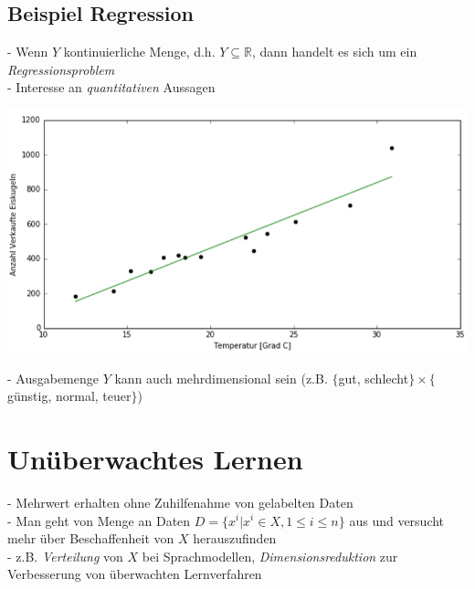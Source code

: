 \documentclass{report}
\begin{document}
\subsection{Beispiel Regression}
- Wenn $Y$ kontinuierliche Menge, d.h. $Y \subseteq \mathbb{R}$, dann handelt es sich um ein \textit{Regressionsproblem}\\
- Interesse an \textit{quantitativen} Aussagen\\
\begin{center}
  \includegraphics[scale=.4]{ml01_3}
\end{center}
- Ausgabemenge $Y$ kann auch mehrdimensional sein (z.B. $\{$gut, schlecht$\}\times \{$günstig, normal, teuer$\}$)

\section{Unüberwachtes Lernen}
- Mehrwert erhalten ohne Zuhilfenahme von gelabelten Daten\\
- Man geht von Menge an Daten $D = \{x^i|x^i \in X, 1 \leq i \leq n\}$ aus und versucht mehr über Beschaffenheit von $X$ herauszufinden\\
- z.B. \textit{Verteilung} von $X$ bei Sprachmodellen, \textit{Dimensionsreduktion} zur Verbesserung von überwachten Lernverfahren
\end{document}

